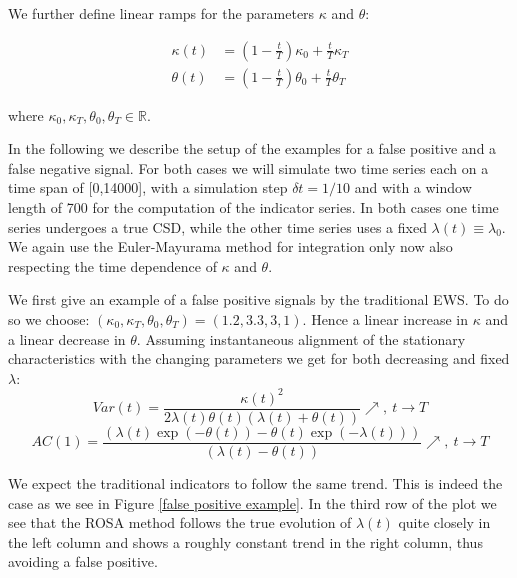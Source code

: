 \documentclass[%
thesis=student,%
coverpage=false,%
titlepage=false,%
headmarks=true, %
english,%
font=libertine, %
math=newpxtx, %
BCOR=5mm,%
coverBCOR=11mm%
]{tumbook}
\begin{document}
We further define linear ramps for the parameters $\kappa$ and $\theta$:

\begin{subequations}
    \begin{align*}
        \kappa(t) &= (1-\frac{t}{T})\kappa_{0} + \frac{t}{T}\kappa_{T} \\
        \theta(t) &= (1-\frac{t}{T})\theta_{0} + \frac{t}{T}\theta_{T}
    \end{align*}
\end{subequations}

where $\kappa_{0},\kappa_{T},\theta_{0},\theta_{T} \in \mathbb{R}$. 

In the following we describe the setup of the examples for a false positive and a false negative signal. For both cases we will simulate two time series each on a time span of [0,14000], with a simulation step $\delta t = 1/10$ and with a window length of 700 for the computation of the indicator series. In both cases one time series undergoes a true CSD, while the other time series uses a fixed $\lambda(t) \equiv \lambda_{0}$. We again use the Euler-Mayurama method for integration only now also respecting the time dependence of $\kappa$ and $\theta$.

We first give an example of a false positive signals by the traditional EWS. To do so we choose: $(\kappa_{0},\kappa_{T},\theta_{0},\theta_{T}) = (1.2,3.3,3,1)$. Hence a linear increase in $\kappa$ and a linear decrease in $\theta$. Assuming instantaneous alignment of the stationary characteristics with the changing parameters we get for both decreasing and fixed $\lambda$: 
\[
Var(t) = \frac{\kappa(t)^2}{2\lambda(t)\theta(t)(\lambda(t) + \theta(t))} \nearrow, \ t \rightarrow T
\]
\[
AC(1) = \frac{(\lambda(t)\exp(-\theta(t))-\theta(t)\exp(-\lambda(t)))}{(\lambda(t)-\theta(t))} \nearrow, \ t \rightarrow T
\]

We expect the traditional indicators to follow the same trend. This is indeed the case as we see in Figure \ref{false positive example}. In the third row of the plot we see that the ROSA method follows the true evolution of $\lambda(t)$ quite closely in the left column and shows a roughly constant trend in the right column, thus avoiding a false positive.
\end{document}
